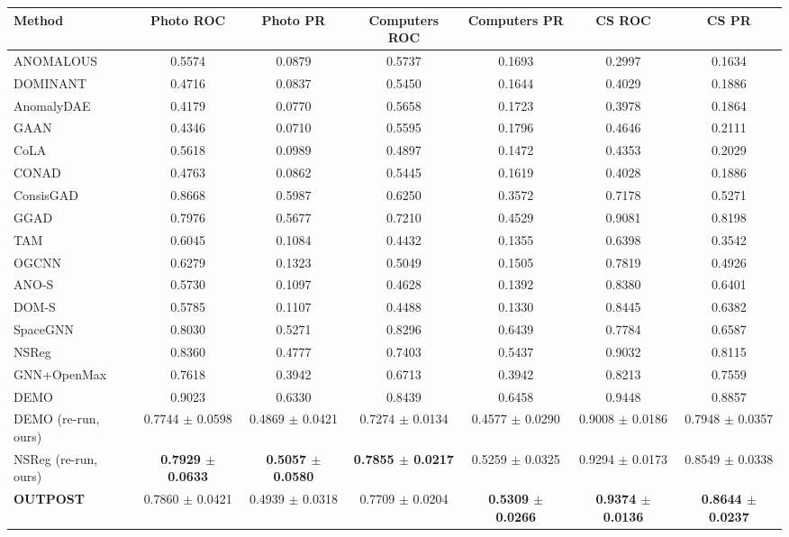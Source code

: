 \begin{table}[t]
\centering
\small
\begin{tabular}{lcccccc}
\toprule
Method & Photo ROC & Photo PR & Computers ROC & Computers PR & CS ROC & CS PR \\
\midrule
ANOMALOUS & 0.5574 & 0.0879 & 0.5737 & 0.1693 & 0.2997 & 0.1634 \\
DOMINANT & 0.4716 & 0.0837 & 0.5450 & 0.1644 & 0.4029 & 0.1886 \\
AnomalyDAE & 0.4179 & 0.0770 & 0.5658 & 0.1723 & 0.3978 & 0.1864 \\
GAAN & 0.4346 & 0.0710 & 0.5595 & 0.1796 & 0.4646 & 0.2111 \\
CoLA & 0.5618 & 0.0989 & 0.4897 & 0.1472 & 0.4353 & 0.2029 \\
CONAD & 0.4763 & 0.0862 & 0.5445 & 0.1619 & 0.4028 & 0.1886 \\
ConsisGAD & 0.8668 & 0.5987 & 0.6250 & 0.3572 & 0.7178 & 0.5271 \\
GGAD & 0.7976 & 0.5677 & 0.7210 & 0.4529 & 0.9081 & 0.8198 \\
TAM & 0.6045 & 0.1084 & 0.4432 & 0.1355 & 0.6398 & 0.3542 \\
OGCNN & 0.6279 & 0.1323 & 0.5049 & 0.1505 & 0.7819 & 0.4926 \\
ANO-S & 0.5730 & 0.1097 & 0.4628 & 0.1392 & 0.8380 & 0.6401 \\
DOM-S & 0.5785 & 0.1107 & 0.4488 & 0.1330 & 0.8445 & 0.6382 \\
SpaceGNN & 0.8030 & 0.5271 & 0.8296 & 0.6439 & 0.7784 & 0.6587 \\
NSReg & 0.8360 & 0.4777 & 0.7403 & 0.5437 & 0.9032 & 0.8115 \\
GNN+OpenMax & 0.7618 & 0.3942 & 0.6713 & 0.3942 & 0.8213 & 0.7559 \\
DEMO & 0.9023 & 0.6330 & 0.8439 & 0.6458 & 0.9448 & 0.8857 \\
DEMO (re-run, ours) & 0.7744 $\pm$ 0.0598 & 0.4869 $\pm$ 0.0421 & 0.7274 $\pm$ 0.0134 & 0.4577 $\pm$ 0.0290 & 0.9008 $\pm$ 0.0186 & 0.7948 $\pm$ 0.0357 \\
NSReg (re-run, ours) & \textbf{0.7929 $\pm$ 0.0633} & \textbf{0.5057 $\pm$ 0.0580} & \textbf{0.7855 $\pm$ 0.0217} & 0.5259 $\pm$ 0.0325 & 0.9294 $\pm$ 0.0173 & 0.8549 $\pm$ 0.0338 \\
\midrule
\textbf{OUTPOST} & 0.7860 $\pm$ 0.0421 & 0.4939 $\pm$ 0.0318 & 0.7709 $\pm$ 0.0204 & \textbf{0.5309 $\pm$ 0.0266} & \textbf{0.9374 $\pm$ 0.0136} & \textbf{0.8644 $\pm$ 0.0237} \\
\bottomrule

\end{tabular}
\end{table}
